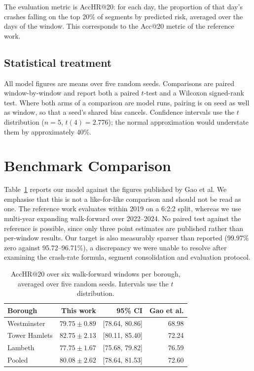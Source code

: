 \documentclass[conference]{IEEEtran}
\begin{document}
The evaluation metric is AccHR@20: for each day, the proportion of that
day's crashes falling on the top 20\% of segments by predicted risk,
averaged over the days of the window. This corresponds to the Acc@20
metric of the reference work.

\subsection{Statistical treatment}

All model figures are means over five random seeds. Comparisons are paired
window-by-window and report both a paired $t$-test and a Wilcoxon
signed-rank test. Where both arms of a comparison are model runs, pairing
is on seed as well as window, so that a seed's shared bias cancels.
Confidence intervals use the $t$ distribution ($n=5$, $t(4)=2.776$); the
normal approximation would understate them by approximately 40\%.

\section{Benchmark Comparison}

Table~\ref{tab:headline} reports our model against the figures published
by Gao et al. We emphasise that this is not a like-for-like comparison and
should not be read as one. The reference work evaluates within 2019 on a
6:2:2 split, whereas we use multi-year expanding walk-forward over
2022--2024. No paired test against the reference is possible, since only
three point estimates are published rather than per-window results. Our
target is also measurably sparser than reported (99.97\% zero against
95.72--96.71\%), a discrepancy we were unable to resolve after examining
the crash-rate formula, segment consolidation and evaluation protocol.

\begin{table}[t]
\caption{AccHR@20 over six walk-forward windows per borough, averaged over
five random seeds. Intervals use the $t$ distribution.}
\label{tab:headline}
\centering
\small
\begin{tabular}{lrrr}
\toprule
Borough & This work & 95\% CI & Gao et al. \\
\midrule
Westminster & $79.75 \pm 0.89$ & [78.64, 80.86] & 68.98 \\
Tower Hamlets & $82.75 \pm 2.13$ & [80.11, 85.40] & 72.24 \\
Lambeth & $77.75 \pm 1.67$ & [75.68, 79.82] & 76.59 \\
\midrule
Pooled & $80.08 \pm 2.62$ & [78.64, 81.53] & 72.60 \\
\bottomrule
\end{tabular}
\end{table}
\end{document}
